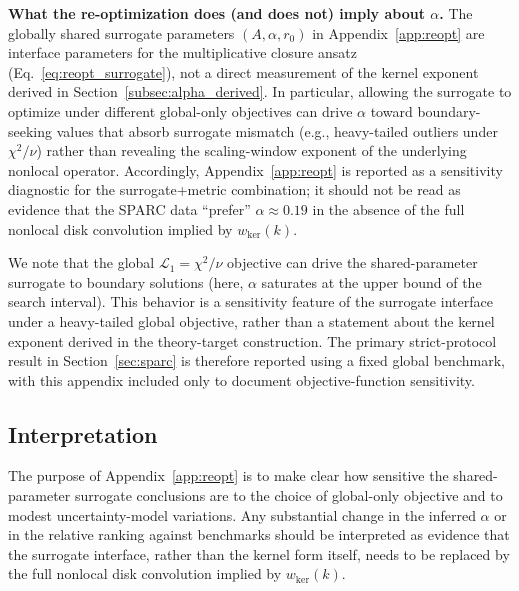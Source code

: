 \documentclass[entropy,article,submit,pdftex,moreauthors]{Definitions/mdpi}
\begin{document}
\noindent\textbf{What the re-optimization does (and does not) imply about \(\alpha\).}
The globally shared surrogate parameters \((A,\alpha,r_0)\) in Appendix~\ref{app:reopt} are interface parameters for the multiplicative closure ansatz (Eq.~\ref{eq:reopt_surrogate}), not a direct measurement of the kernel exponent derived in Section~\ref{subsec:alpha_derived}. In particular, allowing the surrogate to optimize under different global-only objectives can drive \(\alpha\) toward boundary-seeking values that absorb surrogate mismatch (e.g., heavy-tailed outliers under \(\chi^2/\nu\)) rather than revealing the scaling-window exponent of the underlying nonlocal operator. Accordingly, Appendix~\ref{app:reopt} is reported as a sensitivity diagnostic for the surrogate+metric combination; it should not be read as evidence that the SPARC data ``prefer'' \(\alpha\approx 0.19\) in the absence of the full nonlocal disk convolution implied by \(w_{\mathrm{ker}}(k)\).

We note that the global $\mathcal{L}_1 = \chi^2/\nu$ objective can drive the shared-parameter surrogate to boundary solutions (here, $\alpha$ saturates at the upper bound of the search interval). This behavior is a sensitivity feature of the surrogate interface under a heavy-tailed global objective, rather than a statement about the kernel exponent derived in the theory-target construction. The primary strict-protocol result in Section~\ref{sec:sparc} is therefore reported using a fixed global benchmark, with this appendix included only to document objective-function sensitivity.

\subsection{Interpretation}
The purpose of Appendix~\ref{app:reopt} is to make clear how sensitive the shared-parameter surrogate
conclusions are to the choice of global-only objective and to modest uncertainty-model variations. Any substantial change in the inferred \(\alpha\) or in the relative ranking against benchmarks should be interpreted as evidence that the surrogate interface, rather than the kernel form itself, needs to be
replaced by the full nonlocal disk convolution implied by \(w_{\mathrm{ker}}(k)\).
\end{document}
